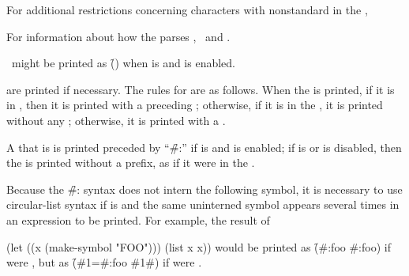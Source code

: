 For additional restrictions concerning characters with  nonstandard
 in the ,  

For information about how the  parses ,
\seesection\SymbolTokens\ and \secref\SharpsignColon.

\nil\ might be printed as \f{()} 
when  is 
and  is enabled.


 are printed if necessary.
The rules for  are as follows.
When the  is printed, if it is in , 
then it is printed with a preceding ; otherwise, if
it is  in the , it is printed without any
; otherwise, it is printed with a .

A  that is  is printed
preceded by ``\f{\#:}'' 
if  is  and  is enabled;
if  is  or  is disabled,
then the  is printed without a prefix,
as if it were in the .

Because the \f{\#:} syntax does not intern the
following symbol, it is necessary to use circular-list syntax
if  is  and
the same uninterned symbol appears several times in an expression
to be printed.  For example, the result of

\code
 (let ((x (make-symbol "FOO"))) (list x x))
\endcode
would be printed as \f{(\#:foo \#:foo)} if 
were , but as \f{(\#1=\#:foo \#1\#)} if 
were .

